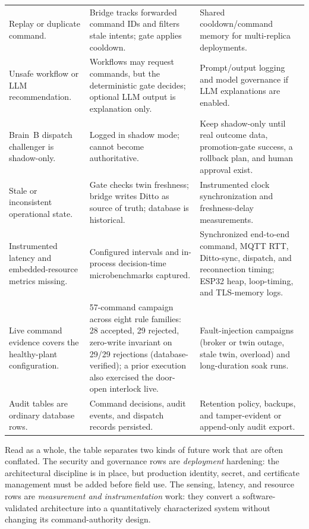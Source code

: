 \documentclass[journal]{IEEEtran}
\newcommand{\bottomrule}{\hline}
\begin{document}
\begin{table}[t]
\begin{tabularx}{\textwidth}{@{}p{}p{}Y@{}}
Replay or duplicate command. & Bridge tracks forwarded command IDs and filters stale intents; gate applies cooldown. & Shared cooldown/command memory for multi-replica deployments. \\
Unsafe workflow or LLM recommendation. & Workflows may request commands, but the deterministic gate decides; optional LLM output is explanation only. & Prompt/output logging and model governance if LLM explanations are enabled. \\
Brain~B dispatch challenger is shadow-only. & Logged in shadow mode; cannot become authoritative. & Keep shadow-only until real outcome data, promotion-gate success, a rollback plan, and human approval exist. \\
Stale or inconsistent operational state. & Gate checks twin freshness; bridge writes Ditto as source of truth; database is historical. & Instrumented clock synchronization and freshness-delay measurements. \\
Instrumented latency and embedded-resource metrics missing. & Configured intervals and in-process decision-time microbenchmarks captured. & Synchronized end-to-end command, MQTT RTT, Ditto-sync, dispatch, and reconnection timing; ESP32 heap, loop-timing, and TLS-memory logs. \\
Live command evidence covers the healthy-plant configuration. & 57-command campaign across eight rule families: 28 accepted, 29 rejected, zero-write invariant on 29/29 rejections (database-verified); a prior execution also exercised the door-open interlock live. & Fault-injection campaigns (broker or twin outage, stale twin, overload) and long-duration soak runs. \\
Audit tables are ordinary database rows. & Command decisions, audit events, and dispatch records persisted. & Retention policy, backups, and tamper-evident or append-only audit export. \\
\bottomrule
\end{tabularx}
\end{table}

Read as a whole, the table separates two kinds of future work that are often conflated. The security and governance rows are \emph{deployment} hardening: the architectural discipline is in place, but production identity, secret, and certificate management must be added before field use. The sensing, latency, and resource rows are \emph{measurement and instrumentation} work: they convert a software-validated architecture into a quantitatively characterized system without changing its command-authority design.
\end{document}
